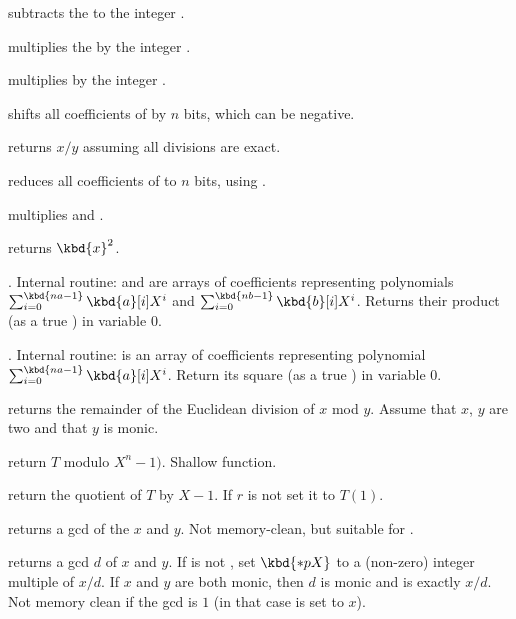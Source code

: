  subtracts the   to the
integer .

 multiplies the   by the
integer .

 multiplies  by the integer .

 shifts all coefficients of  by $n$
bits, which can be negative.

 returns $x/y$ assuming all divisions
are exact.

 reduces all coefficients of  to
$n$ bits, using .

 multiplies  and .

 returns $\kbd{x}^2$.

. Internal routine:
 and  are arrays of coefficients representing polynomials
$\sum_{i = 0}^{\kbd{na-1}} \kbd{a}[i] X^i$ and
$\sum_{i = 0}^{\kbd{nb-1}} \kbd{b}[i] X^i$. Returns their product (as a true
) in variable $0$.

. Internal routine:
 is an array of coefficients representing polynomial
$\sum_{i = 0}^{\kbd{na-1}} \kbd{a}[i] X^i$. Return its square (as a true
) in variable $0$.

 returns the remainder of the Euclidean
division of $x$ mod $y$. Assume that $x$, $y$ are two  and that
$y$ is monic.

 return $T$ modulo $X^n - 1)$. Shallow
function.

 return the quotient of $T$ by $X-1$.
If $r$ is not  set it to $T(1)$.

 returns a gcd of the  $x$ and $y$.
Not memory-clean, but suitable for .

 returns a gcd $d$ of $x$ and
$y$. If  is not , set $\kbd{*pX}$ to a (non-zero) integer
multiple of $x/d$. If $x$ and $y$ are both monic, then $d$ is monic and
 is exactly $x/d$. Not memory clean if the gcd is $1$
(in that case  is set to $x$).

